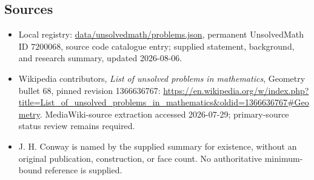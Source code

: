 \documentclass[11pt]{article}
\begin{document}
\subsection{Sources}
\begin{itemize}
\item Local registry: \url{data/unsolvedmath/problems.json}, permanent UnsolvedMath ID \(7200068\), source code catalogue entry; supplied statement, background, and research summary, updated 2026-08-06.
\item Wikipedia contributors, \emph{List of unsolved problems in mathematics}, Geometry bullet 68, pinned revision 1366636767: \url{https://en.wikipedia.org/w/index.php?title=List_of_unsolved_problems_in_mathematics&oldid=1366636767#Geometry}. MediaWiki-source extraction accessed 2026-07-29; primary-source status review remains required.
\item J. H. Conway is named by the supplied summary for existence, without an original publication, construction, or face count. No authoritative minimum-bound reference is supplied.
\end{itemize}
\end{document}
